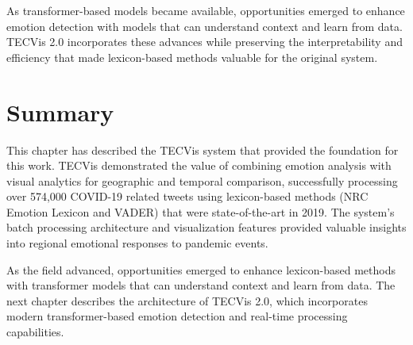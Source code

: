 As transformer-based models became available, opportunities emerged to enhance emotion detection with models that can understand context and learn from data. TECVis 2.0 incorporates these advances while preserving the interpretability and efficiency that made lexicon-based methods valuable for the original system.


\section{Summary}

This chapter has described the TECVis system that provided the foundation for this work. TECVis demonstrated the value of combining emotion analysis with visual analytics for geographic and temporal comparison, successfully processing over 574,000 COVID-19 related tweets using lexicon-based methods (NRC Emotion Lexicon and VADER) that were state-of-the-art in 2019. The system's batch processing architecture and visualization features provided valuable insights into regional emotional responses to pandemic events.

As the field advanced, opportunities emerged to enhance lexicon-based methods with transformer models that can understand context and learn from data. The next chapter describes the architecture of TECVis 2.0, which incorporates modern transformer-based emotion detection and real-time processing capabilities.

